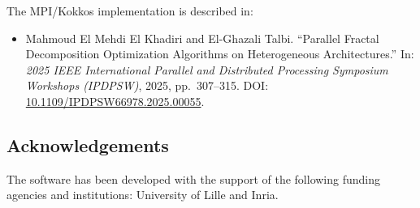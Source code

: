 The MPI/Kokkos implementation is described in:
\begin{itemize}
\item Mahmoud El Mehdi El Khadiri and El-Ghazali Talbi.
``Parallel Fractal Decomposition Optimization Algorithms on Heterogeneous
Architectures.'' In: \textit{2025 IEEE International Parallel and Distributed
Processing Symposium Workshops (IPDPSW)}, 2025, pp.~307--315.
DOI: \href{https://doi.org/10.1109/IPDPSW66978.2025.00055}{10.1109/IPDPSW66978.2025.00055}.
\end{itemize}

\subsection{Acknowledgements}
\label{sec::Zellij:acknowledgements}

The software has been developed with the support of the following
funding agencies and institutions: University of Lille and Inria.
